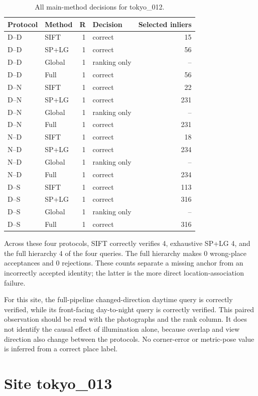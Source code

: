 \begin{table}[H]\centering\small
\caption{All main-method decisions for tokyo\_012.}\label{tab:tokyo-site-12}
\begin{tabular}{llrlr}\toprule
Protocol & Method & R & Decision & Selected inliers \\
\midrule
D--D & SIFT & 1 & correct & 15 \\
D--D & SP+LG & 1 & correct & 56 \\
D--D & Global & 1 & ranking only & -- \\
D--D & Full & 1 & correct & 56 \\
D--N & SIFT & 1 & correct & 22 \\
D--N & SP+LG & 1 & correct & 231 \\
D--N & Global & 1 & ranking only & -- \\
D--N & Full & 1 & correct & 231 \\
N--D & SIFT & 1 & correct & 18 \\
N--D & SP+LG & 1 & correct & 234 \\
N--D & Global & 1 & ranking only & -- \\
N--D & Full & 1 & correct & 234 \\
D--S & SIFT & 1 & correct & 113 \\
D--S & SP+LG & 1 & correct & 316 \\
D--S & Global & 1 & ranking only & -- \\
D--S & Full & 1 & correct & 316 \\
\bottomrule\end{tabular}\end{table}


Across these four protocols, SIFT correctly verifies 4, exhaustive SP+LG 4, and the full hierarchy 4 of the four queries. The full hierarchy makes 0 wrong-place acceptances and 0 rejections. These counts separate a missing anchor from an incorrectly accepted identity; the latter is the more direct location-association failure.

For this site, the full-pipeline changed-direction daytime query is correctly verified, while its front-facing day-to-night query is correctly verified. This paired observation should be read with the photographs and the rank column. It does not identify the causal effect of illumination alone, because overlap and view direction also change between the protocols. No corner-error or metric-pose value is inferred from a correct place label.

\section{Site tokyo\_013}

